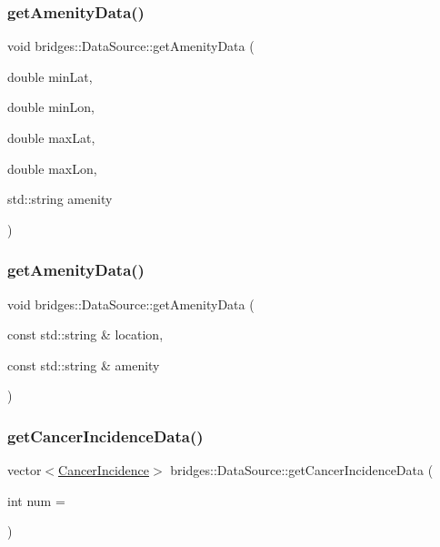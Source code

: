 \subsubsection{\texorpdfstring{get\+Amenity\+Data()}{getAmenityData()}\hspace{0.1cm}{\footnotesize\ttfamily [1/2]}}
{\footnotesize\ttfamily void bridges\+::\+Data\+Source\+::get\+Amenity\+Data (\begin{DoxyParamCaption}\item[{double}]{min\+Lat,  }\item[{double}]{min\+Lon,  }\item[{double}]{max\+Lat,  }\item[{double}]{max\+Lon,  }\item[{std\+::string}]{amenity }\end{DoxyParamCaption})\hspace{0.3cm}{\ttfamily [inline]}}

\mbox{\label{classbridges_1_1_data_source_acbd6561dccd99a331f137d605f6cf6f7}} 
\subsubsection{\texorpdfstring{get\+Amenity\+Data()}{getAmenityData()}\hspace{0.1cm}{\footnotesize\ttfamily [2/2]}}
{\footnotesize\ttfamily void bridges\+::\+Data\+Source\+::get\+Amenity\+Data (\begin{DoxyParamCaption}\item[{const std\+::string \&}]{location,  }\item[{const std\+::string \&}]{amenity }\end{DoxyParamCaption})\hspace{0.3cm}{\ttfamily [inline]}}

\mbox{\label{classbridges_1_1_data_source_a52d8161e7c093ab3615acea7085f6689}} 
\subsubsection{\texorpdfstring{get\+Cancer\+Incidence\+Data()}{getCancerIncidenceData()}}
{\footnotesize\ttfamily vector$<$\hyperlink{classbridges_1_1dataset_1_1_cancer_incidence}{Cancer\+Incidence}$>$ bridges\+::\+Data\+Source\+::get\+Cancer\+Incidence\+Data (\begin{DoxyParamCaption}\item[{int}]{num = {} }\end{DoxyParamCaption})\hspace{0.3cm}{\ttfamily [inline]}}



